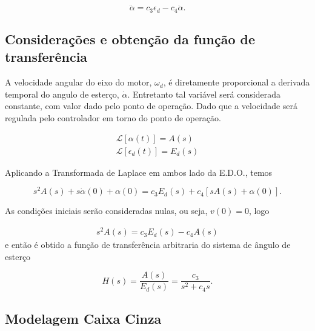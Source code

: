         \begin{equation}
            \ddot \alpha = c_3 \epsilon_d - c_4 \dot \alpha.
        \end{equation}
        
        \subsection{Considerações e obtenção da função de transferência}
		
		    A velocidade angular do eixo do motor, $\omega_d$, é diretamente proporcional a derivada temporal do angulo de esterço, $\dot \alpha$. Entretanto tal variável será considerada constante, com valor dado pelo ponto de operação. Dado que a velocidade será regulada pelo controlador em torno do ponto de operação.
		    
		    \begin{eqnarray}
                \mathcal{L} [\alpha(t)] = A(s)   \nonumber \\
                \mathcal{L} [\epsilon_d (t)] = E_d (s)
            \end{eqnarray}
            
            Aplicando a Transformada de Laplace em ambos lado da E.D.O., temos
            
            \begin{equation}
                s^2 A(s) + s\dot\alpha(0) + \alpha(0) = c_3 E_d(s) + c_4 [sA(s) + \alpha(0)].
            \end{equation}
            
            As condições iniciais serão consideradas nulas, ou seja, $v(0) = 0$, logo
            
            \begin{eqnarray}
                s^2 A(s) = c_3 E_d(s) - c_4 A(s)
            \end{eqnarray}
            e então é obtido a função de transferência arbitraria do sistema de ângulo de esterço
            
            \begin{equation}
                H(s)
                = \frac{A(s)}{E_d(s)}
                = \frac{c_3}{s^2 + c_4 s}.
            \end{equation}
		
	    \subsection{Modelagem Caixa Cinza}
	    
